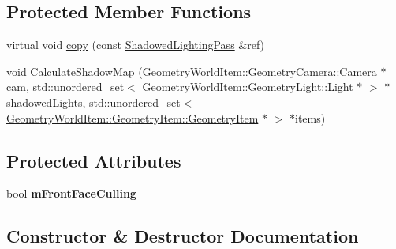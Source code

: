 \subsection*{Protected Member Functions}
\begin{DoxyCompactItemize}
\item 
virtual void \mbox{\hyperlink{class_geometry_engine_1_1_geometry_render_step_1_1_shadowed_lighting_pass_add7b889c49a68911f675ee44ab656699}{copy}} (const \mbox{\hyperlink{class_geometry_engine_1_1_geometry_render_step_1_1_shadowed_lighting_pass}{Shadowed\+Lighting\+Pass}} \&ref)
\item 
void \mbox{\hyperlink{class_geometry_engine_1_1_geometry_render_step_1_1_shadowed_lighting_pass_a6365f5d2036ee96eae06074917f691f3}{Calculate\+Shadow\+Map}} (\mbox{\hyperlink{class_geometry_engine_1_1_geometry_world_item_1_1_geometry_camera_1_1_camera}{Geometry\+World\+Item\+::\+Geometry\+Camera\+::\+Camera}} $\ast$cam, std\+::unordered\+\_\+set$<$ \mbox{\hyperlink{class_geometry_engine_1_1_geometry_world_item_1_1_geometry_light_1_1_light}{Geometry\+World\+Item\+::\+Geometry\+Light\+::\+Light}} $\ast$ $>$ $\ast$shadowed\+Lights, std\+::unordered\+\_\+set$<$ \mbox{\hyperlink{class_geometry_engine_1_1_geometry_world_item_1_1_geometry_item_1_1_geometry_item}{Geometry\+World\+Item\+::\+Geometry\+Item\+::\+Geometry\+Item}} $\ast$ $>$ $\ast$items)
\end{DoxyCompactItemize}
\subsection*{Protected Attributes}
\begin{DoxyCompactItemize}
\item 
\mbox{\label{class_geometry_engine_1_1_geometry_render_step_1_1_shadowed_lighting_pass_aae3f3534c07598d23a6e397dfde2acb9}} 
bool {\bfseries m\+Front\+Face\+Culling}
\end{DoxyCompactItemize}


\subsection{Constructor \& Destructor Documentation}
\mbox{\label{class_geometry_engine_1_1_geometry_render_step_1_1_shadowed_lighting_pass_a16b97807a606bb5ac276e6c9c6e5f745}} 
